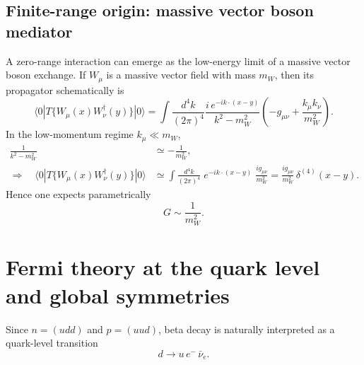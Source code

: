 \subsection{Finite-range origin: massive vector boson mediator}
A zero-range interaction can emerge as the low-energy limit of a massive vector boson exchange.
If $W_\mu$ is a massive vector field with mass $m_W$, then its propagator schematically is
\begin{equation}
\langle 0|T\{W_\mu(x)W_\nu^\dagger(y)\}|0\rangle
=
\int\frac{d^4k}{(2\pi)^4}
\frac{i\,e^{-ik\cdot(x-y)}}{k^2-m_W^2}
\left(-g_{\mu\nu}+\frac{k_\mu k_\nu}{m_W^2}\right).
\end{equation}
In the low-momentum regime $k_\mu\ll m_W$,
\begin{align}
\frac{1}{k^2-m_W^2}
&\simeq
-\frac{1}{m_W^2},\\[1mm]
\Rightarrow\quad
\langle 0|T\{W_\mu(x)W_\nu^\dagger(y)\}|0\rangle
&\simeq
\int\frac{d^4k}{(2\pi)^4}\;e^{-ik\cdot(x-y)}\;\frac{i g_{\mu\nu}}{m_W^2}
=
\frac{i g_{\mu\nu}}{m_W^2}\,\delta^{(4)}(x-y).
\end{align}
Hence one expects parametrically
\begin{equation}
\boxed{G\sim \frac{1}{m_W^2}.}
\end{equation}

\section{Fermi theory at the quark level and global symmetries}
Since $n=(udd)$ and $p=(uud)$, beta decay is naturally interpreted as a quark-level transition
\begin{equation}
d\to u\,e^-\,\bar\nu_e.
\end{equation}

